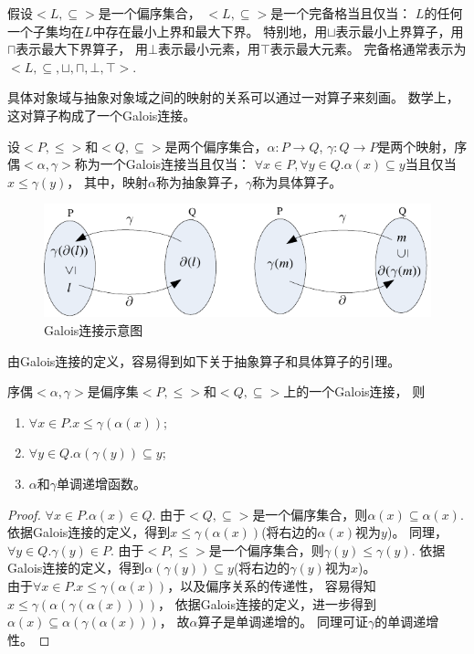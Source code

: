 \begin{definition}
假设$<L, \subseteq>$是一个偏序集合，
$<L, \subseteq>$是一个完备格当且仅当：
$L$的任何一个子集均在$L$中存在最小上界和最大下界。
特别地，用$\sqcup$表示最小上界算子，用$\sqcap$表示最大下界算子，
用$\bot$表示最小元素，用$\top$表示最大元素。
完备格通常表示为$<L, \subseteq, \sqcup, \sqcap, \bot, \top>$.
\end{definition}


具体对象域与抽象对象域之间的映射的关系可以通过一对算子来刻画。
数学上，这对算子构成了一个Galois连接。


\begin{definition}
设$<P, \leq>$和$<Q, \subseteq>$是两个偏序集合，$\alpha:P \rightarrow Q$,
$\gamma: Q \rightarrow P$是两个映射，序偶$<\alpha, \gamma>$称为一个Galois连接当且仅当：
$\forall x\in P, \forall y\in Q. \alpha(x) \subseteq y$当且仅当$x\leq \gamma(y)$，
其中，映射$\alpha$称为抽象算子，$\gamma$称为具体算子。
\end{definition}

\begin{figure}[h]
\centering
\includegraphics{figures/chap05/galois.pdf}
\caption{Galois连接示意图}
\label{fig-galois}
\end{figure}

由Galois连接的定义，容易得到如下关于抽象算子和具体算子的引理。

\begin{lemma}
序偶$<\alpha, \gamma>$是偏序集$<P, \leq>$和$<Q, \subseteq>$上的一个Galois连接， 则
\begin{enumerate}
\item $\forall x\in P. x \leq \gamma(\alpha(x))$;
\item $\forall y\in Q. \alpha(\gamma(y)) \subseteq y$;
\item $\alpha$和$\gamma$单调递增函数。
\end{enumerate}
\end{lemma}
	
\begin{proof}
$\forall x\in P. \alpha(x) \in Q$. 
由于$<Q, \subseteq>$是一个偏序集合，则$\alpha(x) \subseteq \alpha(x)$.
依据Galois连接的定义，得到$ x \leq \gamma(\alpha(x))$(将右边的$\alpha(x)$视为$y$)。
同理，$\forall y \in Q. \gamma(y) \in P$.
由于$<P, \leq>$是一个偏序集合，则$\gamma(y) \leq \gamma(y)$.
依据Galois连接的定义，得到$\alpha(\gamma(y)) \subseteq y$(将右边的$\gamma(y)$视为$x$)。\\
由于$\forall x\in P. x\leq \gamma(\alpha(x))$，以及偏序关系的传递性，
容易得知$ x\leq \gamma(\alpha(\gamma(\alpha(x))))$，
依据Galois连接的定义，进一步得到$\alpha(x)\subseteq \alpha(\gamma(\alpha(x)))$，
故$\alpha$算子是单调递增的。
同理可证$\gamma$的单调递增性。
\end{proof}


